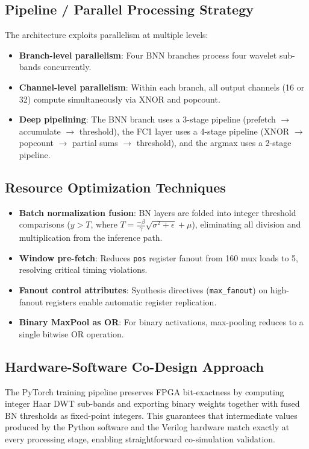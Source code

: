 \documentclass[conference]{IEEEtran}
\begin{document}
\subsection{Pipeline / Parallel Processing Strategy}

The architecture exploits parallelism at multiple levels:
\begin{itemize}
    \item \textbf{Branch-level parallelism}: Four BNN branches process four wavelet sub-bands concurrently.
    \item \textbf{Channel-level parallelism}: Within each branch, all output channels (16 or 32) compute simultaneously via XNOR and popcount.
    \item \textbf{Deep pipelining}: The BNN branch uses a 3-stage pipeline (prefetch $\rightarrow$ accumulate $\rightarrow$ threshold), the FC1 layer uses a 4-stage pipeline (XNOR $\rightarrow$ popcount $\rightarrow$ partial sums $\rightarrow$ threshold), and the argmax uses a 2-stage pipeline.
\end{itemize}

\subsection{Resource Optimization Techniques}

\begin{itemize}
    \item \textbf{Batch normalization fusion}: BN layers are folded into integer threshold comparisons ($y > T$, where $T = \frac{-\beta}{\gamma}\sqrt{\sigma^2+\epsilon} + \mu$), eliminating all division and multiplication from the inference path.
    \item \textbf{Window pre-fetch}: Reduces \texttt{pos} register fanout from 160 mux loads to 5, resolving critical timing violations.
    \item \textbf{Fanout control attributes}: Synthesis directives (\texttt{max\_fanout}) on high-fanout registers enable automatic register replication.
    \item \textbf{Binary MaxPool as OR}: For binary activations, max-pooling reduces to a single bitwise OR operation.
\end{itemize}

\subsection{Hardware-Software Co-Design Approach}

The PyTorch training pipeline preserves FPGA bit-exactness by computing integer Haar DWT sub-bands and exporting binary weights together with fused BN thresholds as fixed-point integers. This guarantees that intermediate values produced by the Python software and the Verilog hardware match exactly at every processing stage, enabling straightforward co-simulation validation.
\end{document}
